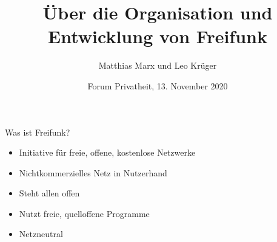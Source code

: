 \documentclass[t,aspectratio=169]{beamer}
\title{Über die Organisation und\\ Entwicklung von Freifunk}
\author{\newline\newline\newline\newline\newline\newline\newline\newline Matthias Marx und Leo Krüger}
\date{Forum Privatheit, 13. November 2020}
\begin{document}
  \maketitle
  
  \begin{frame}{Was ist Freifunk?} 
    \begin{itemize}
      \item Initiative für freie, offene, kostenlose Netzwerke
      \item Nichtkommerzielles Netz in Nutzerhand
      \item Steht allen offen
      \item Nutzt freie, quelloffene Programme
      \item Netzneutral
    \end{itemize}
  \end{frame}
  
\end{document}
